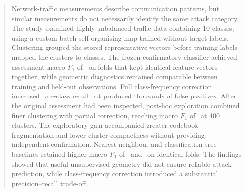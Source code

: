 \begin{abstract}
Network-traffic measurements describe communication patterns, but similar measurements do not necessarily identify the same attack category. The study examined highly imbalanced traffic data containing 10 classes, using a custom batch self-organising map trained without target labels. Clustering grouped the stored representative vectors before training labels mapped the clusters to classes. The frozen confirmatory classifier achieved assessment macro $F_1$ of \ConfirmF\ on folds that kept identical feature vectors together, while geometric diagnostics remained comparable between training and held-out observations. Full class-frequency correction increased rare-class recall but produced thousands of false positives. After the original assessment had been inspected, post-hoc exploration combined finer clustering with partial correction, reaching macro $F_1$ of \ExploreBF\ at 400 clusters. The exploratory gain accompanied greater codebook fragmentation and lower cluster compactness without providing independent confirmation. Nearest-neighbour and classification-tree baselines retained higher macro $F_1$ of \NeighbourF\ and \TreeF\ on identical folds. The findings showed that useful unsupervised geometry did not ensure reliable attack prediction, while class-frequency correction introduced a substantial precision--recall trade-off.
\end{abstract}
